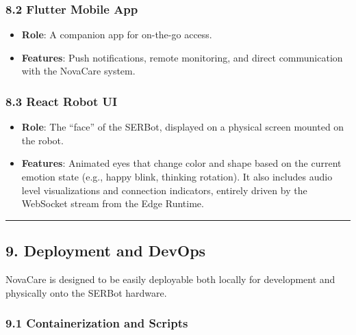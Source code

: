 \documentclass[
]{article}
\providecommand{\tightlist}{%
  \setlength{\itemsep}{0pt}\setlength{\parskip}{0pt}}
\begin{document}
\subsubsection{8.2 Flutter Mobile App}\label{flutter-mobile-app}

\begin{itemize}
\tightlist
\item
  \textbf{Role}: A companion app for on-the-go access.
\item
  \textbf{Features}: Push notifications, remote monitoring, and direct
  communication with the NovaCare system.
\end{itemize}

\subsubsection{8.3 React Robot UI}\label{react-robot-ui}

\begin{itemize}
\tightlist
\item
  \textbf{Role}: The ``face'' of the SERBot, displayed on a physical
  screen mounted on the robot.
\item
  \textbf{Features}: Animated eyes that change color and shape based on
  the current emotion state (e.g., happy blink, thinking rotation). It
  also includes audio level visualizations and connection indicators,
  entirely driven by the WebSocket stream from the Edge Runtime.
\end{itemize}

\begin{center}\rule{0.5\linewidth}{0.5pt}\end{center}

\subsection{9. Deployment and DevOps}\label{deployment-and-devops}

NovaCare is designed to be easily deployable both locally for
development and physically onto the SERBot hardware.

\subsubsection{9.1 Containerization and
Scripts}\label{containerization-and-scripts}
\end{document}
